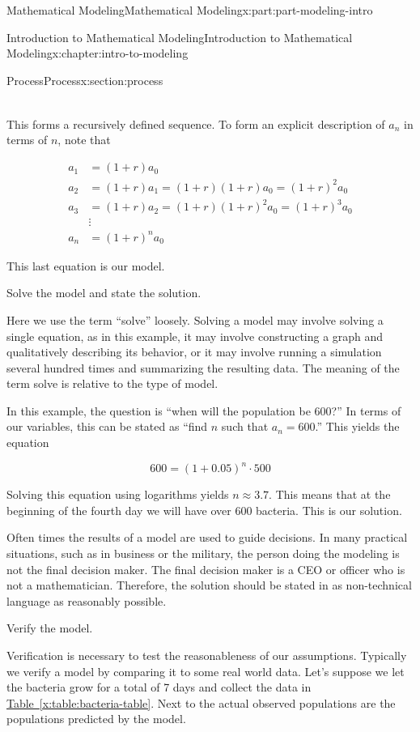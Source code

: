 \documentclass[oneside,10pt,]{book}
\newcommand{\xreffont}{\relax}
\numberwithin{equation}{section}
\begin{document}
\begin{partptx}{Mathematical Modeling}{}{Mathematical Modeling}{}{}{x:part:part-modeling-intro}
\begin{chapterptx}{Introduction to Mathematical Modeling}{}{Introduction to Mathematical Modeling}{}{}{x:chapter:intro-to-modeling}
\begin{sectionptx}{Process}{}{Process}{}{}{x:section:process}
\begin{description}
\begin{equation*}
\begin{aligned}
\end{aligned}	
\end{equation*}
%
\par
This forms a recursively defined sequence. To form an explicit description of \(a_n\) in terms of \(n\), note that%
\par
%
\begin{equation*}
\begin{aligned}
a_1 & = (1+r)a_0 \\
a_2 & = (1+r)a_1 = (1+r)(1+r)a_0 = (1+r)^2 a_0 \\
a_3 & = (1+r)a_2 = (1+r)(1+r)^2 a_0 = (1+r)^3 a_0 \\
& \vdots \\
a_n & = (1+r)^n a_0
\end{aligned}
\end{equation*}
%
\par
This last equation is our model.%
\item[{Step 6:}]Solve the model and state the solution.%
\par
Here we use the term “solve” loosely. Solving a model may involve solving a single equation, as in this example, it may involve constructing a graph and qualitatively describing its behavior, or it may involve running a simulation several hundred times and summarizing the resulting data. The meaning of the term solve is relative to the type of model.%
\par
In this example, the question is “when will the population be 600?” In terms of our variables, this can be stated as “find \(n\) such that \(a_n = 600\).” This yields the equation%
\par
%
\begin{equation*}
600 = (1+0.05)^n\cdot 500
\end{equation*}
%
\par
Solving this equation using logarithms yields \(n\approx 3.7\). This means that at the beginning of the fourth day we will have over 600 bacteria. This is our solution.%
\par
Often times the results of a model are used to guide decisions. In many practical situations, such as in business or the military, the person doing the modeling is not the final decision maker. The final decision maker is a CEO or officer who is not a mathematician. Therefore, the solution should be stated in as non-technical language as reasonably possible.%
\item[{Step 7:}]Verify the model.%
\par
Verification is necessary to test the reasonableness of our assumptions. Typically we verify a model by comparing it to some real world data. Let’s suppose we let the bacteria grow for a total of 7 days and collect the data in \hyperref[x:table:bacteria-table]{Table~{\xreffont\ref{x:table:bacteria-table}}}. Next to the actual observed populations are the populations predicted by the model.%

\end{description}
\end{sectionptx}
\end{chapterptx}
\end{partptx}
\end{document}
